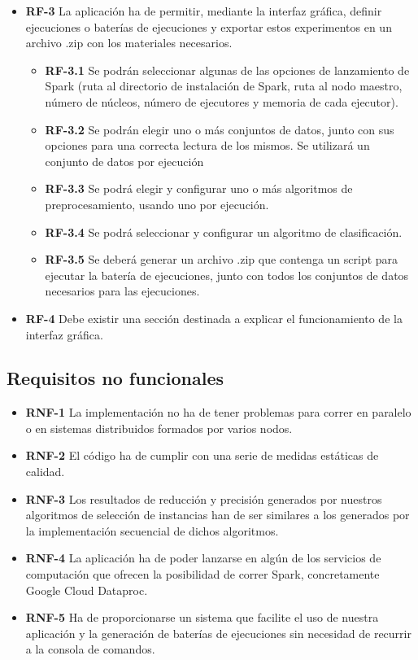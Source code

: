 \begin{itemize}
\item \textbf{RF-3} La aplicación ha de permitir, mediante la interfaz gráfica, definir ejecuciones o baterías de ejecuciones y exportar estos experimentos en un archivo .zip con los materiales necesarios.
	\begin{itemize}
		\item \textbf{RF-3.1} Se podrán seleccionar algunas de las opciones de lanzamiento de Spark (ruta al directorio de instalación de Spark, ruta al nodo maestro, número de núcleos, número de ejecutores y memoria de cada ejecutor).
		\item \textbf{RF-3.2} Se podrán elegir uno o más conjuntos de datos, junto con sus opciones para una correcta lectura de los mismos. Se utilizará un conjunto de datos por ejecución
		\item \textbf{RF-3.3} Se podrá elegir y configurar uno o más algoritmos de preprocesamiento, usando uno por ejecución.
		\item \textbf{RF-3.4} Se podrá seleccionar y configurar un algoritmo de clasificación.
		\item \textbf{RF-3.5} Se deberá generar un archivo .zip que contenga un script para ejecutar la batería de ejecuciones, junto con todos los conjuntos de datos necesarios para las ejecuciones.
	\end{itemize}

\item \textbf{RF-4} Debe existir una sección destinada a explicar el funcionamiento de la interfaz gráfica.

\end{itemize}

\subsection{Requisitos no funcionales}

\begin{itemize}

\item \textbf{RNF-1} La implementación no ha de tener problemas para correr en paralelo o en sistemas distribuidos formados por varios nodos.

\item \textbf{RNF-2} El código ha de cumplir con una serie de medidas estáticas de calidad.

\item \textbf{RNF-3} Los resultados de reducción y precisión generados por nuestros algoritmos de selección de instancias han de ser similares a los generados por la implementación secuencial de dichos algoritmos.

\item \textbf{RNF-4} La aplicación ha de poder lanzarse en algún de los servicios de computación que ofrecen la posibilidad de correr Spark, concretamente Google Cloud Dataproc.

\item \textbf{RNF-5} Ha de proporcionarse un sistema que facilite el uso de nuestra aplicación y la generación de baterías de ejecuciones sin necesidad de recurrir a la consola de comandos.

\end{itemize}

